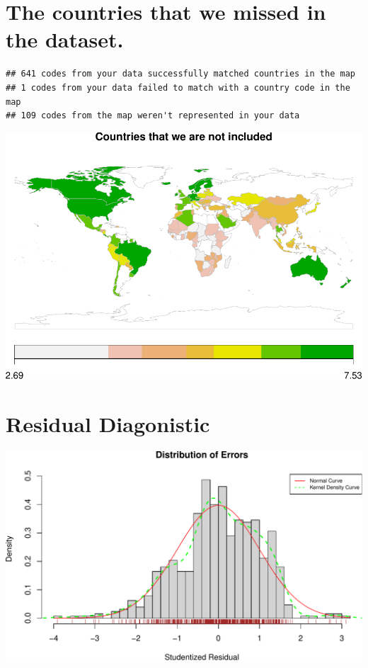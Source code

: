 \documentclass[11pt,a4paper,]{article}
\begin{document}
\hypertarget{the-countries-that-we-missed-in-the-dataset.}{%
\section{The countries that we missed in the dataset.}\label{the-countries-that-we-missed-in-the-dataset.}}

\begin{verbatim}
## 641 codes from your data successfully matched countries in the map
## 1 codes from your data failed to match with a country code in the map
## 109 codes from the map weren't represented in your data
\end{verbatim}

\includegraphics{Assignment4_files/figure-latex/unnamed-chunk-11-1.pdf}

\hypertarget{residual-diagonistic}{%
\section{Residual Diagonistic}\label{residual-diagonistic}}

\includegraphics{Assignment4_files/figure-latex/unnamed-chunk-12-1.pdf}
\end{document}
